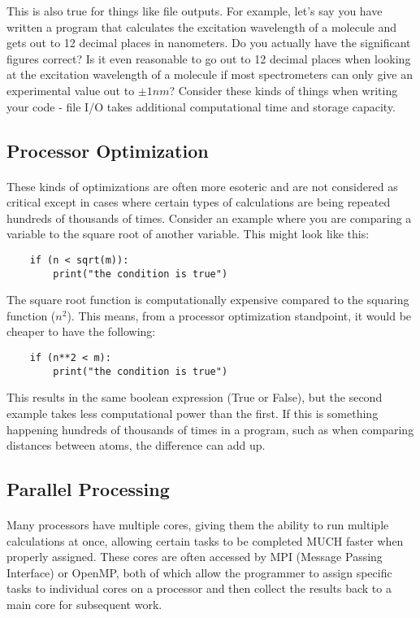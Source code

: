 This is also true for things like file outputs.
For example, let's say you have written a program that calculates the excitation wavelength of a molecule and gets out to 12 decimal places in nanometers.
Do you actually have the significant figures correct?
Is it even reasonable to go out to 12 decimal places when looking at the excitation wavelength of a molecule if most spectrometers can only give an experimental value out to $\pm1nm$?
Consider these kinds of things when writing your code - file I/O takes additional computational time and storage capacity.

\subsection*{Processor Optimization}
\paragraph{} These kinds of optimizations are often more esoteric and are not considered as critical except in cases where certain types of calculations are being repeated hundreds of thousands of times.
Consider an example where you are comparing a variable to the square root of another variable.
This might look like this:

\begin{verbatim}
    if (n < sqrt(m)):
        print("the condition is true")
\end{verbatim}

The square root function is computationally expensive compared to the squaring function ($n^2$).
This means, from a processor optimization standpoint, it would be cheaper to have the following:

\begin{verbatim}
    if (n**2 < m):
        print("the condition is true")
\end{verbatim}

This results in the same boolean expression (True or False), but the second example takes less computational power than the first.  
If this is something happening hundreds of thousands of times in a program, such as when comparing distances between atoms, the difference can add up.  

\subsection*{Parallel Processing}
\paragraph{}Many processors have multiple cores, giving them the ability to run multiple calculations at once, allowing certain tasks to be completed MUCH faster when properly assigned.
These cores are often accessed by MPI (Message Passing Interface) or OpenMP, both of which allow the programmer to assign specific tasks to individual cores on a processor and then collect the results back to a main core for subsequent work.

